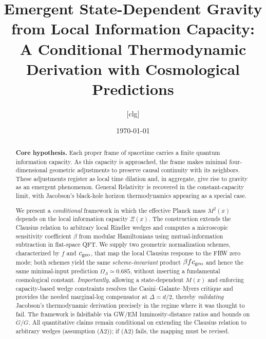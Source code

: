 \documentclass[aps,prd,onecolumn,superscriptaddress,nofootinbib]{revtex4-2}
\begin{document}
\title{Emergent State-Dependent Gravity from Local Information Capacity:
\texorpdfstring{\\}{ }A Conditional Thermodynamic Derivation with Cosmological Predictions}

\author{[clg]}
\date{\today}

\begin{abstract}
\textbf{Core hypothesis.} Each proper frame of spacetime carries a finite quantum information capacity. As this capacity is approached, the frame makes minimal four-dimensional geometric adjustments to preserve causal continuity with its neighbors. These adjustments register as local time dilation and, in aggregate, give rise to gravity as an emergent phenomenon. General Relativity is recovered in the constant-capacity limit, with Jacobson’s black-hole horizon thermodynamics appearing as a special case.

We present a \emph{conditional} framework in which the effective Planck mass \(M^2(x)\) depends on the local information capacity \(\Xi(x)\). The construction extends the Clausius relation to arbitrary local Rindler wedges and computes a microscopic sensitivity coefficient \(\beta\) from modular Hamiltonians using mutual-information subtraction in flat-space QFT. We supply two geometric normalization schemes, characterized by \(f\) and \(c_{\rm geo}\), that map the local Clausius response to the FRW zero mode; both schemes yield the same \emph{scheme-invariant} product \(\beta f c_{\rm geo}\) and hence the same minimal-input prediction \(\Omega_\Lambda \simeq 0.685\), without inserting a fundamental cosmological constant. \emph{Importantly}, allowing a state-dependent \(M(x)\) and enforcing capacity-based wedge constraints resolves the Casini--Galante--Myers critique and provides the needed marginal-log compensator at \(\Delta=d/2\), thereby \emph{validating} Jacobson’s thermodynamic derivation precisely in the regime where it was thought to fail. The framework is falsifiable via GW/EM luminosity-distance ratios and bounds on \(\dot G/G\). All quantitative claims remain conditional on extending the Clausius relation to arbitrary wedges (assumption (A2)); if (A2) fails, the mapping must be revised.
\end{abstract}

\maketitle

\end{document}
